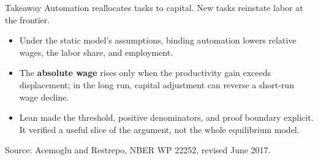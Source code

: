 \documentclass[aspectratio=169,11pt]{beamer}
\newcommand{\key}[1]{{\color{accent}\bfseries #1}}
\newcommand{\sourcefoot}{\vfill{\color{muted}\scriptsize Source: Acemoglu and Restrepo, NBER WP 22252, revised June 2017.}}
\begin{document}
\begin{frame}{Takeaway}
\large Automation reallocates tasks to capital. New tasks reinstate labor at the frontier.
\vspace{0.7em}
\begin{itemize}\setlength\itemsep{0.7em}
\item Under the static model's assumptions, binding automation lowers relative wages, the labor share, and employment.
\item The \key{absolute wage} rises only when the productivity gain exceeds displacement; in the long run, capital adjustment can reverse a short-run wage decline.
\item Lean made the threshold, positive denominators, and proof boundary explicit. It verified a useful slice of the argument, not the whole equilibrium model.
\end{itemize}
\sourcefoot
\end{frame}
\end{document}
